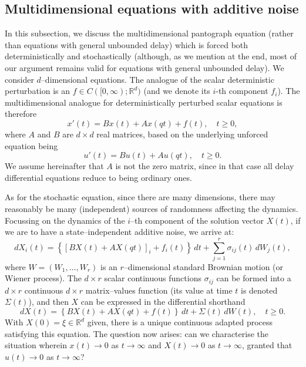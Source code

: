 \documentclass[a4paper,10pt,reqno]{amsart}
\numberwithin{equation}{section}
\theoremstyle{definition}
\theoremstyle{remark}
\DeclareMathOperator{\1}{\mathbbm 1}
\begin{document}
\subsection{Multidimensional equations with additive noise}
In this subsection, we discuss the multidimensional pantograph equation (rather than equations with general unbounded delay) which is forced both deterministically and stochastically (although, as we mention at the end, most of our argument remains valid for equations with general unbounded delay). We consider $d$--dimensional equations. The analogue of the scalar deterministic perturbation is an $f\in C([0,\infty);\mathbb{R}^d)$ (and we denote its $i$-th component $f_i$). The multidimensional analogue for deterministically perturbed scalar equations is therefore 
\[
x'(t)=Bx(t)+Ax(qt)+f(t), \quad t\geq 0,
\]
where $A$ and $B$ are $d\times d$ real matrices, based on the underlying unforced equation being 
\begin{equation} \label{eq.multidpantou}
u'(t)=Bu(t)+Au(qt), \quad t\geq 0.
\end{equation}
We assume hereinafter that $A$ is not the zero matrix, since in that case all delay differential equations reduce to being  ordinary ones. 

As for the stochastic equation, since there are many dimensions, there may reasonably be many (independent) sources of randomness affecting the dynamics. Focussing on the dynamics of the $i$--th component of the solution vector $X(t)$, if we are to have a state--independent additive noise, we arrive at:
\[
dX_i(t)=\left\{[BX(t)+AX(qt)]_i+f_i(t)\right\}\,dt+\sum_{j=1}^r \sigma_{ij}(t)\,dW_j(t), 
\]
where $W=(W_1,\ldots,W_r)$ is an $r$--dimensional standard Brownian motion (or Wiener process). The $d\times r$ scalar continuous functions $\sigma_{ij}$ can be formed into a $d\times r$ continuous $d\times r$ matrix--values function (its value at time $t$ is denoted $\Sigma(t)$), and then $X$ can be expressed in the differential shorthand 
\begin{equation} \label{eq.stochmultidpanto}
dX(t)=\left\{BX(t)+AX(qt)+f(t)\right\}\,dt+\Sigma(t)\,dW(t), \quad t\geq 0. 
\end{equation}
With $X(0)=\xi\in \mathbb{R}^d$ given, there is a unique continuous adapted process satisfying this equation. 
The question now arises: can we characterise the situation wherein $x(t)\to 0$ as $t\to\infty$ and $X(t)\to 0$ as $t\to\infty$, granted that $u(t)\to 0$ as $t\to\infty$?
\end{document}
